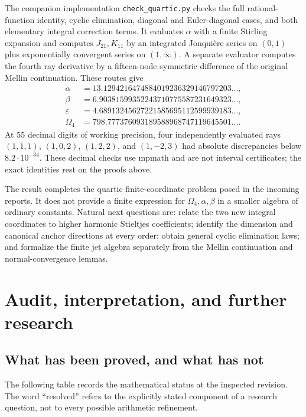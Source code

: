 \documentclass[11pt]{article}
\numberwithin{equation}{section}
\theoremstyle{definition}
\theoremstyle{remark}
\begin{document}
The companion implementation \texttt{check\_quartic.py} checks
the full rational-function identity, cyclic elimination, diagonal and
Euler-diagonal cases, and both elementary integral correction terms.
It evaluates $\alpha$ with a finite Stirling expansion and computes
$J_{21},K_{11}$ by an integrated Jonqui\`ere series on $(0,1)$ plus
exponentially convergent series on $(1,\infty)$. A separate evaluator
computes the fourth ray derivative by a fifteen-node symmetric
difference of the original Mellin continuation. These routes give
\begin{align*}
 \alpha&=13.1294216474884019236329146797203\ldots,\\
 \beta&=6.90381599352243710775587231649323\ldots,\\
 \varepsilon&=4.68913245627221585695112599939183\ldots,\\
 \Omega_4&=798.777376093189588968747119645501\ldots.
\end{align*}
At 55 decimal digits of working precision, four independently evaluated
rays $(1,1,1)$, $(1,0,2)$, $(1,2,2)$, and $(1,-2,3)$ had absolute discrepancies
below $8.2\cdot10^{-34}$. These decimal checks use mpmath and are not
interval certificates; the exact identities rest on the proofs above.

The result completes the quartic finite-coordinate problem posed in the
incoming reports. It does not provide a finite expression for
$\Omega_4,\alpha,\beta$ in a smaller algebra of ordinary constants.
Natural next questions are: relate the two new integral coordinates to
higher harmonic Stieltjes coefficients; identify the dimension and
canonical anchor directions at every order; obtain general cyclic
elimination laws; and formalize the finite jet algebra separately from
the Mellin continuation and normal-convergence lemmas.



\section{Audit, interpretation, and further research}
\label{sec:audit}

\subsection{What has been proved, and what has not}

The following table records the mathematical status at the inspected
revision. The word ``resolved'' refers to the explicitly stated component
of a research question, not to every possible arithmetic refinement.
\end{document}
